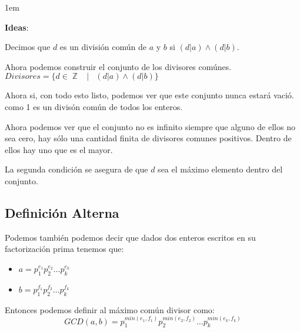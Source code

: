 \documentclass[12pt, fleqn]{report}                             %
\newenvironment{SmallIndentation}[1][0.75em]                    %
    {\begin{adjustwidth}{#1}{}\begin{footnotesize}}                 %
    {\end{footnotesize}\end{adjustwidth}}                           %
\DeclareMathOperator \Space {\quad}                             %
\DeclareMathOperator \MiniSpace {\;}                            %
\newcommand \Such {\MiniSpace|\MiniSpace}                       %
\DeclareMathOperator \Integers  {\mathbb{Z}}                     %
\begin{document}
            \begin{SmallIndentation}[1em]
                \textbf{Ideas}:

                Decimos que $d$ es un división común de $a$ y $b$ si $(d|a) \land (d|b)$.

                Ahora podemos construir el conjunto de los divisores comúnes.
                $Divisores = \{ d \in \Integers \Such (d|a) \land (d|b) \}$

                Ahora si, con todo esto listo, podemos ver que este conjunto nunca estará vació. 
                como 1 es un divisón común de todos los enteros.

                Ahora podemos ver que el conjunto no es infinito siempre que alguno de ellos no sea cero,
                hay sólo una cantidad finita de divisores comunes positivos. Dentro de ellos hay uno
                que es el mayor.

                La segunda condición se asegura de que $d$ sea el máximo elemento dentro del conjunto.

            \end{SmallIndentation}


        \subsection*{Definición Alterna}

            Podemos también podemos decir que dados dos enteros escritos en 
            su factorización prima tenemos que:
            \begin{itemize}
                \item $a = p_1^{e_1} p_2^{e_2} \dots p_k^{e_k}$
                \item $b = p_1^{f_1} p_2^{f_2} \dots p_k^{f_k}$
            \end{itemize}

            Entonces podemos definir al máximo común divisor como:
            \begin{equation}
                GCD(a, b) = p_1^{min(e_1, f_1)} p_2^{min(e_2, f_2)} \dots p_k^{min(e_k, f_k)}
            \end{equation}
\end{document}
